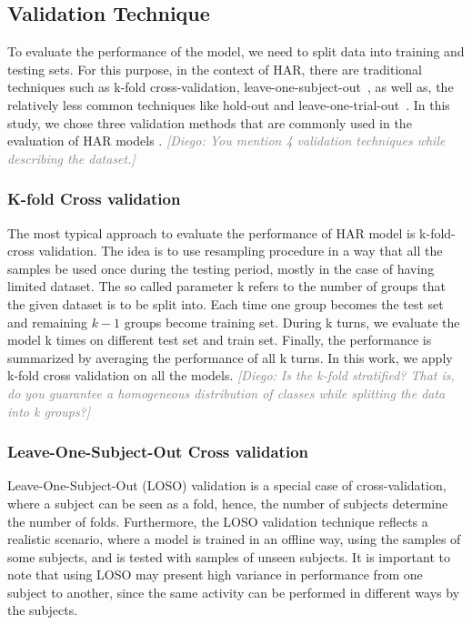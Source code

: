 \documentclass[journal,article,submit,moreauthors,pdftex]{Definitions/mdpi}
\newcommand{\diego}[1]{\textcolor{gray}{{\it [Diego: #1]}}}
\begin{document}
\subsection{Validation Technique}
To evaluate the performance of the model, we need to split data into training and testing sets. For this purpose, in the context of HAR, there are traditional techniques such as k-fold cross-validation, leave-one-subject-out~\cite{jordao2018human}, as well as, the relatively less common techniques like hold-out and leave-one-trial-out~\cite{sena2018multiscale}. In this study, we chose three validation methods that are commonly used in the evaluation of HAR models \cite{wang2019survey}. 
\diego{You mention 4 validation techniques while describing the dataset.}

\subsubsection{K-fold Cross validation}
The most typical approach to evaluate the performance of HAR model is k-fold-cross validation. The idea is to use resampling procedure in a way that all the samples be used once during the testing period, mostly in the case of having limited dataset. The so called parameter k refers to the number of groups that the given dataset is to be split into. Each time one group becomes the test set and remaining $k-1$ groups become training set. During k turns, we evaluate the model k times on different test set and train set. Finally, the performance is summarized by averaging the performance of all k turns. In this work, we apply k-fold cross validation on all the models. 
\diego{Is the k-fold stratified? That is, do you guarantee a homogeneous distribution of classes while splitting the data into k groups?}

\subsubsection{Leave-One-Subject-Out Cross validation}
Leave-One-Subject-Out (LOSO) validation is a special case of cross-validation, where a subject can be seen as a fold, hence, the number of subjects determine the number of folds. Furthermore, the LOSO validation technique reflects a realistic scenario, where a model is trained in an offline way, using the samples of some subjects, and is tested with samples of unseen subjects. It is important to note that using LOSO may present high variance in performance from one subject to another, since the same activity can be performed in different ways by the subjects. 
\end{document}
